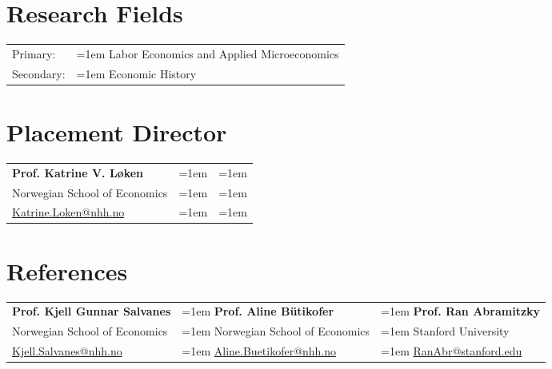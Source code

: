 \documentclass[11pt,]{article}
\begin{document}
\hypertarget{research-fields}{%
\section{Research Fields}\label{research-fields}}

\vspace{-1mm}
\begin{tabular}{p{.85in}>{\hangindent=1em}p{5.65in}<{\raggedright}}
Primary:   & Labor Economics and Applied Microeconomics\\
Secondary: & Economic History\\
\end{tabular}
\vspace{-1mm}

\hypertarget{placement-director}{%
\section{Placement Director}\label{placement-director}}

\begin{tabular}{p{2.15in}>{\hangindent=1em}p{2.15in}>{\hangindent=1em}p{2.15in}<{\raggedright}}
\textbf{Prof. Katrine V. L\o ken}\\
Norwegian School of Economics\\
\href{mailto:Katrine.Loken@nhh.no}{Katrine.Loken@nhh.no}\\
\end{tabular}

\hypertarget{references}{%
\section{References}\label{references}}

\begin{tabular}{p{2.15in}>{\hangindent=1em}p{2.15in}>{\hangindent=1em}p{2.15in}<{\raggedright}}
\textbf{Prof. Kjell Gunnar Salvanes}   & \textbf{Prof. Aline Bütikofer} &  \textbf{Prof. Ran Abramitzky}\\
Norwegian School of Economics & Norwegian School of Economics & Stanford University\\
\href{mailto:Kjell.Salvanes@nhh.no}{Kjell.Salvanes@nhh.no} \vspace{2mm} & \href{mailto:Aline.Buetikofer@nhh.no}{Aline.Buetikofer@nhh.no} \vspace{2mm} & \href{mailto:RanAbr@stanford.edu}{RanAbr@stanford.edu}\\
\end{tabular}
\end{document}
